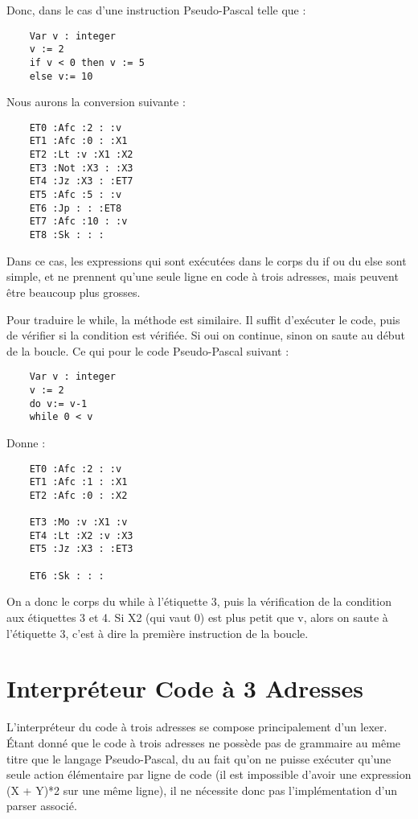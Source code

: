 \documentclass{article}
\begin{document}
Donc, dans le cas d'une instruction Pseudo-Pascal telle que :
\begin{lstlisting}
    Var v : integer
    v := 2
    if v < 0 then v := 5
    else v:= 10
\end{lstlisting}

Nous aurons la conversion suivante :

\begin{lstlisting}
    ET0 :Afc :2 : :v
    ET1 :Afc :0 : :X1
    ET2 :Lt :v :X1 :X2
    ET3 :Not :X3 : :X3
    ET4 :Jz :X3 : :ET7
    ET5 :Afc :5 : :v
    ET6 :Jp : : :ET8
    ET7 :Afc :10 : :v
    ET8 :Sk : : :
\end{lstlisting}

Dans ce cas, les expressions qui sont exécutées dans le corps du if ou du else sont simple, et ne prennent qu'une seule ligne en code à trois adresses, mais peuvent être beaucoup plus grosses.

\bigbreak

Pour traduire le while, la méthode est similaire. Il suffit d’exécuter le code, puis de vérifier si la condition est vérifiée. Si oui on continue, sinon on saute au début de la boucle. Ce qui pour le code Pseudo-Pascal suivant :

\begin{lstlisting}
    Var v : integer
    v := 2
    do v:= v-1
    while 0 < v
\end{lstlisting}

Donne :

\begin{lstlisting}
    ET0 :Afc :2 : :v
    ET1 :Afc :1 : :X1
    ET2 :Afc :0 : :X2

    ET3 :Mo :v :X1 :v
    ET4 :Lt :X2 :v :X3
    ET5 :Jz :X3 : :ET3

    ET6 :Sk : : :
\end{lstlisting}

On a donc le corps du while à l'étiquette 3, puis la vérification de la condition aux étiquettes 3 et 4. Si X2 (qui vaut 0) est plus petit que v, alors on saute à l'étiquette 3, c'est à dire la première instruction de la boucle.


\newpage
\section{Interpréteur Code à 3 Adresses}

L'interpréteur du code à trois adresses se compose principalement d'un lexer. Étant donné que le code à trois adresses ne possède pas de grammaire au même titre que le langage Pseudo-Pascal,
du au fait qu'on ne puisse exécuter qu'une seule action élémentaire par ligne de code (il est impossible d'avoir une expression (X + Y)*2 sur une même ligne), il ne nécessite donc pas l'implémentation d'un parser associé.
\end{document}
